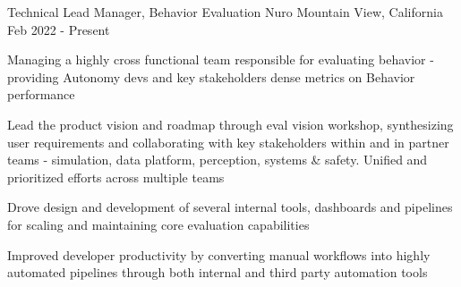
\begin{cventries}

  \cventry
	{Technical Lead Manager, Behavior Evaluation} %
	{Nuro} %
	{Mountain View, California} %
	{Feb 2022 - Present} %
	{
		\begin{cvitems}
		\item {Managing a highly cross functional team responsible for evaluating behavior - providing Autonomy devs and key stakeholders dense metrics on Behavior performance}
		\item {Lead the product vision and roadmap through eval vision workshop, synthesizing user requirements and collaborating with key stakeholders within and in partner teams - simulation, data platform, perception, systems \& safety. Unified and prioritized efforts across multiple teams}
		\item {Drove design and development of several internal tools, dashboards and pipelines for scaling and maintaining core evaluation capabilities}
		\item {Improved developer productivity by converting manual workflows into highly automated pipelines through both internal and third party automation tools}	
		\end{cvitems}	
	}


\end{cventries}
